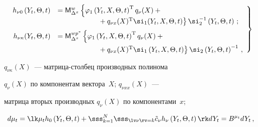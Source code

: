 \begin{equation}

   \left.

   \begin{array}{rl}

    h_{\nu 0} \left(Y_t,\Theta,t\right) &={\sf M}_{\Delta^x}^{w} \left\{ \varphi_1

    \left(Y_t,X,\Theta,t\right)^{\mathrm{T}} q_{\nu} (X) +{}\right.\\

&\left.  \hspace*{20mm}  {}+q_{\nu x} (X)^{\mathrm{T}} \si_1(Y_t,X,\Theta,t)\right\}

   \si_2^{-1}\left(Y_t,\Theta,t\right)\,; %

\\[6pt]

h_{\nu \kappa} (Y_t,\Theta,t) &=

{\sf M}_{\Delta^x}^{wp^*} \left\{ \varphi_1\left(Y_t,X,\Theta,t\right)^{\mathrm{T}} 

q_{\nu} (X) +{}\right.\\[6pt]

&\left.\hspace*{20mm}{}+q_{\nu x} (X)^{\mathrm{T}} \si_1\left(Y_t,X,\Theta,t\right)\right\}

    \si_2\left(Y_t,\Theta,t\right)^{-1}\,,

    \end{array}

    \right\}

    \label{e5.4-s1}


    \end{equation}

$q_{\nu\kappa}(X)$~--- матрица-столбец производных полинома

$q_\nu (X)$ по компонентам вектора~$X$; $q_{\nu xx} (X)$~---

матрица вторых производных  $q_\nu (X)$ по компонентами~$x$;

\begin{equation}

d\mu_t =\lk \mu_t h_0 \left(Y_t,\Theta,t\right) +

\sss_{k=1}^N\sss_{\lv\nu\rv=k} \tilde c_\nu h_\nu \left(Y_t,\Theta,t\right)\rk dY_t = 

B^{\mu_t} dY_t\,,\label{e5.8-s1}

\end{equation}

